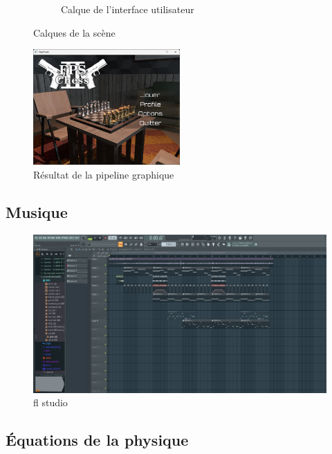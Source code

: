 \begin{figure}[H]
\begin{subfigure}{0.3\textwidth}
            \caption{Calque de l'interface utilisateur}
            \label{fig:graphics_pipeline_gbuffer_gui}
        \end{subfigure}
        \caption{Calques de la scène}
        \label{fig:graphics_pipeline_post_processing}
    \end{figure}
    \begin{figure}[H]
        \centering
        \includegraphics[width=0.5\textwidth]{images/raptiquax_rendering_result.png}
        \caption{Résultat de la pipeline graphique}
        \label{fig:graphics_pipeline_result}
    \end{figure}
\subsection{Musique}
\begin{figure}[H]
    \centering
    \includegraphics[width=1\linewidth]{images/flstudio.png}
    \caption{fl studio}
    \label{fig:flstudio.png}
\end{figure}

\newpage


\subsection{Équations de la physique}
    \label{sec:physics_equations}
